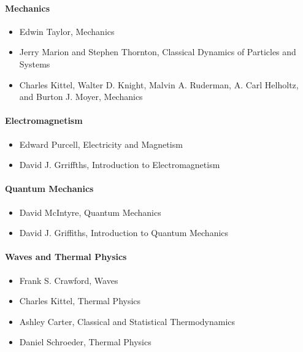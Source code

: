 \documentclass[letterpaper,10pt,english]{jupyterBook}
\begin{document}
\paragraph{Mechanics}
\label{\detokenize{content/0_course/2_design:mechanics}}\begin{itemize}
\item {} 
\sphinxAtStartPar
Edwin Taylor, Mechanics

\item {} 
\sphinxAtStartPar
Jerry Marion and Stephen Thornton, Classical Dynamics of Particles and Systems

\item {} 
\sphinxAtStartPar
Charles Kittel, Walter D. Knight, Malvin A. Ruderman, A. Carl Helholtz, and Burton J. Moyer, Mechanics

\end{itemize}


\paragraph{Electromagnetism}
\label{\detokenize{content/0_course/2_design:electromagnetism}}\begin{itemize}
\item {} 
\sphinxAtStartPar
Edward Purcell, Electricity and Magnetism

\item {} 
\sphinxAtStartPar
David J. Grriffths, Introduction to Electromagnetism

\end{itemize}


\paragraph{Quantum Mechanics}
\label{\detokenize{content/0_course/2_design:quantum-mechanics}}\begin{itemize}
\item {} 
\sphinxAtStartPar
David McIntyre, Quantum Mechanics

\item {} 
\sphinxAtStartPar
David J. Griffiths, Introduction to Quantum Mechanics

\end{itemize}


\paragraph{Waves and Thermal Physics}
\label{\detokenize{content/0_course/2_design:waves-and-thermal-physics}}\begin{itemize}
\item {} 
\sphinxAtStartPar
Frank S. Crawford, Waves

\item {} 
\sphinxAtStartPar
Charles Kittel, Thermal Physics

\item {} 
\sphinxAtStartPar
Ashley Carter, Classical and Statistical Thermodynamics

\item {} 
\sphinxAtStartPar
Daniel Schroeder, Thermal Physics

\end{itemize}
\end{document}
